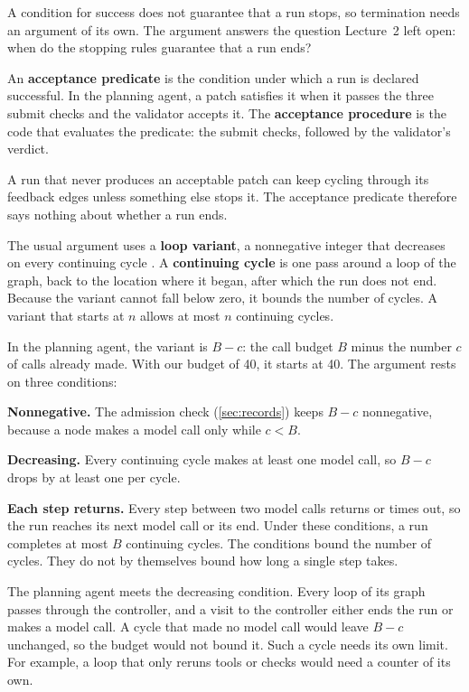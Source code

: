 A condition for success does not guarantee that a run stops, so termination needs an argument of
its own. The argument answers the question Lecture~2 left open: when do the stopping rules guarantee
that a run ends?

An \textbf{acceptance predicate} is the condition under which a run is declared successful. In the
planning agent, a patch satisfies it when it passes the three submit checks and the validator
accepts it. The \textbf{acceptance procedure} is the code that evaluates the predicate: the submit
checks, followed by the validator's verdict.

A run that never produces an acceptable patch can keep cycling through its feedback edges unless
something else stops it. The acceptance predicate therefore says nothing about whether a run ends.

The usual argument uses a \textbf{loop variant}, a nonnegative integer that decreases on every
continuing cycle \citep{cornell-cs2112-loopinv}. A \textbf{continuing cycle} is one pass around a
loop of the graph, back to the location where it began, after which the run does not end. Because
the variant cannot fall below zero, it bounds the number of cycles. A variant that starts at $n$
allows at most $n$ continuing cycles.

In the planning agent, the variant is $B - c$: the call budget $B$ minus the number $c$ of calls
already made. With our budget of 40, it starts at 40. The argument rests on three conditions:
\bi
\item \textbf{Nonnegative.} The admission check (\cref{sec:records}) keeps $B - c$ nonnegative,
because a node makes a model call only while $c < B$.
\item \textbf{Decreasing.} Every continuing cycle makes at least one model call, so $B - c$ drops by
at least one per cycle.
\item \textbf{Each step returns.} Every step between two model calls returns or times out, so the run
reaches its next model call or its end.
\ei
Under these conditions, a run completes at most $B$ continuing cycles. The conditions bound the
number of cycles. They do not by themselves bound how long a single step takes.

The planning agent meets the decreasing condition. Every loop of its graph passes through the
controller, and a visit to the controller either ends the run or makes a model call. A cycle that
made no model call would leave $B - c$ unchanged, so the budget would not bound it. Such a cycle
needs its own limit. For example, a loop that only reruns tools or checks would need a counter of
its own.

